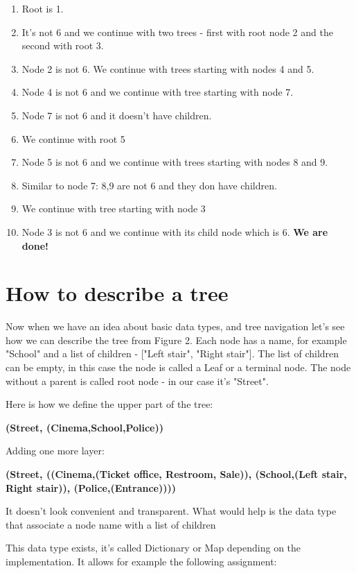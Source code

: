 \begin{leftborder}
\begin{enumerate}
\item Root is 1.
\item It's not 6 and we continue with two trees - first with root node 2
and the second with root 3.
\item Node 2 is not 6. We continue with trees starting with nodes 4 and 5.
\item Node 4 is not 6 and we continue with tree starting with node 7.
\item Node 7 is not 6 and it doesn't have children.
\item We continue with root 5
\item Node 5 is not 6 and we continue with trees starting
with nodes 8 and 9.
\item Similar to node 7: 8,9 are not 6 and they don have children.
\item We continue with tree starting with node 3
\item Node 3 is not 6 and we continue with its child node which is 6.
\textbf{We are done!}
\end{enumerate}
\end{leftborder}


\section{How to describe a tree}

Now when we have an idea about basic data types, and tree navigation
let's see how we can
describe the tree from Figure 2. Each node has a name, for example "School"
and a list of children - ["Left stair", "Right stair"]. The list of children can be empty, in this case the node is called a Leaf or a terminal node. The node without
a parent is called root node - in our case it's "Street".

Here is how we define
the upper part of the tree:

\medskip
\textbf{(Street, (Cinema,School,Police))}
\medskip

Adding one more layer:

\medskip
\textbf{(Street, ((Cinema,(Ticket office, Restroom, Sale)), (School,(Left stair, Right stair)), (Police,(Entrance))))}
\medskip

It doesn't look convenient and transparent. What would help is the data type
that associate a node name with a list of children

This data type exists, it's called Dictionary or Map depending on the implementation.
It allows for example the following assignment:

